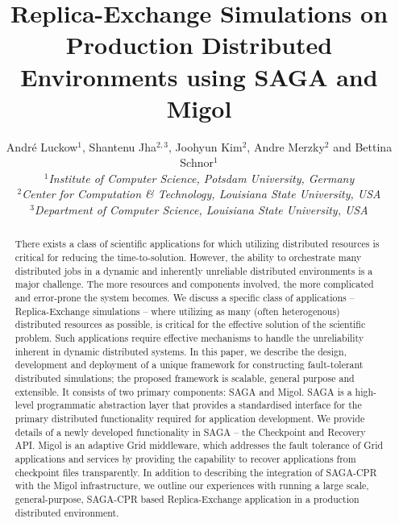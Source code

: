 \documentclass[times, 10pt, twocolumn]{article}
\title{Replica-Exchange Simulations on Production Distributed
  Environments using SAGA and Migol}
\author{
  Andr\'e Luckow$^{1}$, Shantenu Jha$^{2,3}$, Joohyun Kim$^{2}$, Andre Merzky$^{2}$ and Bettina Schnor$^{1}$\\
  \small{\emph{$^{1}$Institute of Computer Science, Potsdam University, Germany}}\\
  \small{\emph{$^{2}$Center for Computation \& Technology, Louisiana State University, USA}}\\
  \small{\emph{$^{3}$Department of Computer Science, Louisiana State University, USA}}\\
}
\begin{document}
 


\maketitle    

\begin{abstract}
  There exists a class of scientific applications for which utilizing
  distributed resources is critical for reducing the
  time-to-solution. However, the ability to orchestrate many
  distributed jobs in a dynamic and inherently unreliable distributed
  environments is a major challenge. The more resources and components
  involved, %
  the more complicated and error-prone the system becomes. We discuss
  a specific class of applications -- Replica-Exchange simulations
  -- where utilizing as many (often heterogenous) distributed
  resources as possible, is critical for the effective solution of the
  scientific problem. Such applications require effective mechanisms
  to handle the unreliability inherent in dynamic distributed systems.
  In this paper, we describe the design, development and deployment of
  a unique framework for constructing fault-tolerant distributed
  simulations; %
  the proposed framework is scalable, general purpose and
  extensible. It consists of two primary components: SAGA and Migol.
  SAGA is a high-level programmatic abstraction layer that provides a
  standardised interface for the primary distributed functionality
  required for application development. We provide details of a newly
  developed functionality in SAGA -- the Checkpoint and Recovery
  API. Migol is an adaptive Grid middleware, which addresses the fault
  tolerance of Grid applications and services by providing the
  capability to recover applications from checkpoint files
  transparently.  In addition to describing
  the integration of SAGA-CPR with the Migol infrastructure, 
  we outline our experiences with
  running a large scale, general-purpose, SAGA-CPR based
  Replica-Exchange application in a production distributed
  environment.

    

\end{abstract}
\end{document}
